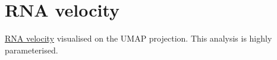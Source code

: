 \section{RNA velocity}

\href{https://doi.org/10.1038/s41586-018-0414-6}{RNA velocity} visualised on the UMAP projection. This analysis is highly parameterised.




\clearpage